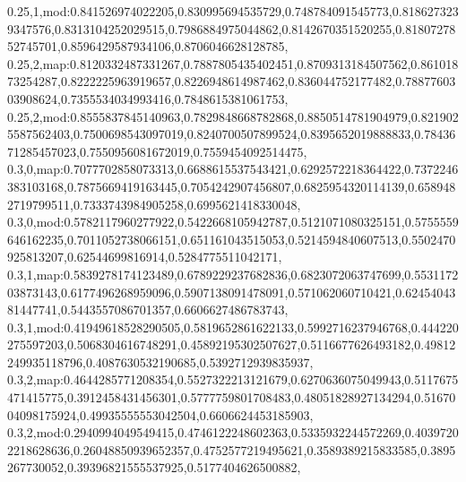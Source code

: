 0.25,1,mod:0.841526974022205,0.830995694535729,0.748784091545773,0.8186273239347576,0.8313104252029515,0.7986884975044862,0.8142670351520255,0.8180727852745701,0.8596429587934106,0.8706046628128785,
0.25,2,map:0.8120332487331267,0.7887805435402451,0.8709313184507562,0.86101873254287,0.8222225963919657,0.8226948614987462,0.836044752177482,0.7887760303908624,0.7355534034993416,0.7848615381061753,
0.25,2,mod:0.8555837845140963,0.7829848668782868,0.8850514781904979,0.8219025587562403,0.7500698543097019,0.8240700507899524,0.8395652019888833,0.7843671285457023,0.7550956081672019,0.7559454092514475,
0.3,0,map:0.7077702858073313,0.6688615537543421,0.6292572218364422,0.7372246383103168,0.7875669419163445,0.7054242907456807,0.6825954320114139,0.6589482719799511,0.7333743984905258,0.6995621418330048,
0.3,0,mod:0.5782117960277922,0.5422668105942787,0.5121071080325151,0.5755559646162235,0.7011052738066151,0.651161043515053,0.5214594840607513,0.5502470925813207,0.62544699816914,0.5284775511042171,
0.3,1,map:0.5839278174123489,0.6789229237682836,0.6823072063747699,0.553117203873143,0.6177496268959096,0.5907138091478091,0.571062060710421,0.6245404381447741,0.5443557086701357,0.6606627486783743,
0.3,1,mod:0.41949618528290505,0.5819652861622133,0.5992716237946768,0.444220275597203,0.5068304616748291,0.45892195302507627,0.5116677626493182,0.49812249935118796,0.4087630532190685,0.5392712939835937,
0.3,2,map:0.4644285771208354,0.5527322213121679,0.6270636075049943,0.5117675471415775,0.3912458431456301,0.5777759801708483,0.48051828927134294,0.5167004098175924,0.49935555553042504,0.6606624453185903,
0.3,2,mod:0.2940994049549415,0.4746122248602363,0.5335932244572269,0.40397202218628636,0.26048850939652357,0.4752577219495621,0.3589389215833585,0.3895267730052,0.39396821555537925,0.5177404626500882,
